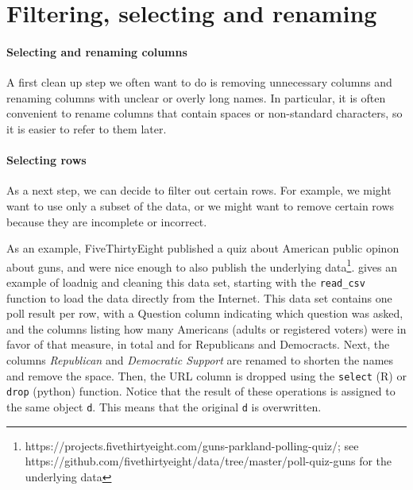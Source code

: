 
\section{Filtering, selecting and renaming}


\paragraph{Selecting and renaming columns}
A first clean up step we often want to do is removing unnecessary columns and renaming columns with unclear or overly long names.
In particular, it is often convenient to rename columns that contain spaces or non-standard characters, so it is easier to refer to them later.

\paragraph{Selecting rows}
As a next step, we can decide to filter out certain rows.
For example, we might want to use only a subset of the data,
or we might want to remove certain rows because they are incomplete or incorrect.

As an example, FiveThirtyEight published a quiz about American public opinon about guns,
and were nice enough to also publish the underlying data\footnote{https://projects.fivethirtyeight.com/guns-parkland-polling-quiz/; see https://github.com/fivethirtyeight/data/tree/master/poll-quiz-guns for the underlying data}.
 gives an example of loadnig and cleaning this data set, starting with the \verb+read_csv+ function to load the data directly from the Internet.
This data set contains one poll result per row, with a Question column indicating which question was asked,
and the columns listing how many Americans (adults or registered voters) were in favor of that measure, in total and for Republicans and Democracts.
Next, the columns \emph{Republican} and \emph{Democratic Support} are renamed to shorten the names and remove the space.
Then, the URL column is dropped using the \verb+select+ (R) or \verb+drop+ (python) function.
Notice that the result of these operations is assigned to the same object \verb+d+.
This means that the original \verb+d+ is overwritten.

  
